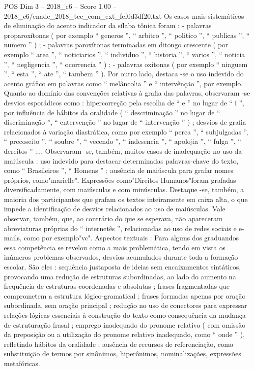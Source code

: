 \begin{textsample}{POS Dim 3 – 2018\_c6 – Score 1.00 – 2018\_c6/enade\_2018\_tec\_com\_ext\_fef0d3df20.txt}
Os casos mais sistemáticos de eliminação do acento indicador da sílaba tônica foram : - palavras proparoxítonas ( por exemplo “ generos ”, “ arbitro ”, “ politico ”, “ publicas ”, “ numero ” ) ; - palavras paroxítonas terminadas em ditongo crescente ( por exemplo “ area ”, “ noticiarios ”, “ individuo ”, “ historia ”, “ varios ”, “ noticia ”, “ negligencia ”, “ ocorrencia ” ) ; - palavras oxítonas ( por exemplo “ ninguem ”, “ esta ”, “ ate ”, “ tambem ” ).
Por outro lado, destaca -se o uso indevido do acento gráfico em palavras como “ melâncolia ” e “ intervênção ”, por exemplo.
Quanto ao domínio das convenções relativas à grafia das palavras, observaram -se desvios esporádicos como : hipercorreção pela escolha de “ e ” no lugar de “ i ”, por influência de hábitos da oralidade ( “ descriminação ” no lugar de “ discriminação ”, “ entervenção ” no lugar de “ intervenção ” ) ; desvios de grafia relacionados à variação diastrática, como por exemplo “ perca ”, “ subjulgadas ”, “ precoseito ”, “ soubre ”, “ vecendo ”, “ indesencia ”, “ apolojia ”, “ fulga ”, “ dereitos ” ;...
Observaram -se, também, muitos casos de inadequação no uso da maiúscula : uso indevido para destacar determinadas palavras-chave do texto, como “ Brasileiros ”, “ Homens ” ; ausência de maiúscula para grafar nomes próprios, como"marielle".
Expressões como"Direitos Humanos"foram grafadas diversificadamente, com maiúsculas e com minúsculas.
Destaque -se, também, a maioria dos participantes que grafam os textos inteiramente em caixa alta, o que impede a identificação de desvios relacionados ao uso de maiúsculas.
Vale observar, também, que, ao contrário do que se esperava, não apareceram abreviaturas próprias do “ internetês ”, relacionadas ao uso de redes sociais e e-mails, como por exemplo"vc".
Aspectos textuais : Para alguns dos graduandos essa competência se revelou como a mais problemática, tendo em vista os inúmeros problemas observados, desvios acumulados durante toda a formação escolar.
São eles : sequência justaposta de ideias sem encaixamentos sintáticos, provocando uma redução de estruturas subordinadas, ao lado do aumento na frequência de estruturas coordenadas e absolutas ; frases fragmentadas que comprometem a estrutura lógico-gramatical ; frases formadas apenas por oração subordinada, sem oração principal ; redução no uso de conectores para expressar relações lógicas essenciais à construção do texto como consequência da mudança de estruturação frasal ; emprego inadequado do pronome relativo ( com omissão da preposição ou a utilização do pronome relativo inadequado, como “ onde ” ), refletindo hábitos da oralidade ; ausência de recursos de referenciação, como substituição de termos por sinônimos, hiperônimos, nominalizações, expressões metafóricas.

\end{textsample}
